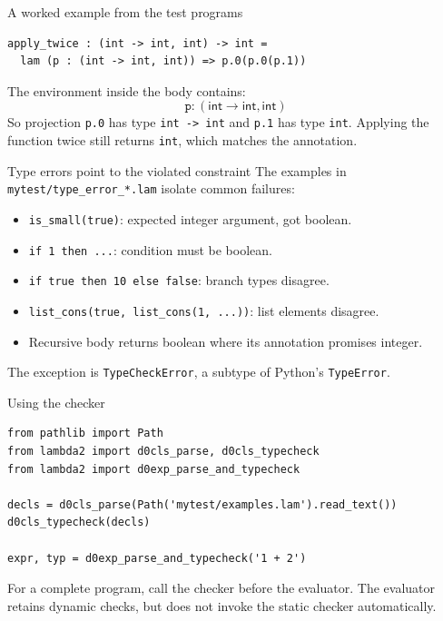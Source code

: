 \documentclass[aspectratio=169,11pt]{beamer}
\newcommand{\Int}{\mathsf{int}}
\begin{document}
\begin{frame}[fragile]{A worked example from the test programs}
\begin{lstlisting}
apply_twice : (int -> int, int) -> int =
  lam (p : (int -> int, int)) => p.0(p.0(p.1))
\end{lstlisting}
The environment inside the body contains:
\[
\texttt{p}:(\Int\to\Int,\Int)
\]
So projection \texttt{p.0} has type \texttt{int -> int} and \texttt{p.1} has type \texttt{int}. Applying the function twice still returns \texttt{int}, which matches the annotation.
\end{frame}

\begin{frame}{Type errors point to the violated constraint}
The examples in \texttt{mytest/type\_error\_*.lam} isolate common failures:
\begin{itemize}
  \item \texttt{is\_small(true)}: expected integer argument, got boolean.
  \item \texttt{if 1 then ...}: condition must be boolean.
  \item \texttt{if true then 10 else false}: branch types disagree.
  \item \texttt{list\_cons(true, list\_cons(1, ...))}: list elements disagree.
  \item Recursive body returns boolean where its annotation promises integer.
\end{itemize}
The exception is \texttt{TypeCheckError}, a subtype of Python's \texttt{TypeError}.
\end{frame}

\begin{frame}[fragile]{Using the checker}
\begin{lstlisting}
from pathlib import Path
from lambda2 import d0cls_parse, d0cls_typecheck
from lambda2 import d0exp_parse_and_typecheck

decls = d0cls_parse(Path('mytest/examples.lam').read_text())
d0cls_typecheck(decls)

expr, typ = d0exp_parse_and_typecheck('1 + 2')
\end{lstlisting}
For a complete program, call the checker before the evaluator. The evaluator retains dynamic checks, but does not invoke the static checker automatically.
\end{frame}
\end{document}
